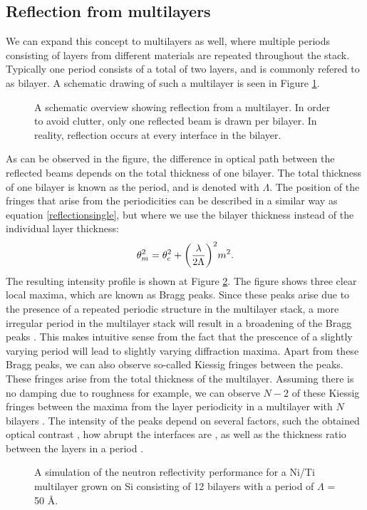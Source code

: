 \subsection{Reflection from multilayers}\label{multilayer_scattering}
We can expand this concept to multilayers as well, where multiple periods consisting of layers from different materials are repeated throughout the stack. Typically one period consists of a total of two layers, and is commonly refered to as bilayer. A schematic drawing of such a multilayer is seen in Figure \ref{multilayersketch}.
\begin{figure}[b]
	\centering
	\def\svgwidth{\textwidth}
	
	\caption{A schematic overview showing reflection from a multilayer. In order to avoid clutter, only one reflected beam is drawn per bilayer. In reality, reflection occurs at every interface in the bilayer.}
	\label{multilayersketch}
\end{figure}
As can be observed in the figure, the difference in optical path between the reflected beams depends on the total thickness of one bilayer. The total thickness of one bilayer is known as the period, and is denoted with $\Lambda$. The position of the fringes that arise from the periodicities can be described in a similar way as equation \ref{reflectionsingle}, but where we use the bilayer thickness instead of the individual layer thickness:
\begin{equation}\label{reflectionmulti}
	\theta_m^2 = \theta_c^2 + \qty(\frac{\lambda}{2\Lambda})^2m^2.
\end{equation}
The resulting intensity profile is shown at Figure \ref{simulatedmultilayer}. The figure shows three clear local maxima, which are known as Bragg peaks. Since these peaks arise due to the presence of a repeated periodic structure in the multilayer stack, a more irregular period in the multilayer stack will result in a broadening of the Bragg peaks \cite{shinjo_takada_1987}. This makes intuitive sense from the fact that the prescence of a slightly varying period will lead to slightly varying diffraction maxima. Apart from these Bragg peaks, we can also observe so-called Kiessig fringes between the peaks. These fringes arise from the total thickness of the multilayer. Assuming there is no damping due to roughness for example, we can observe $N - 2$ of these Kiessig fringes between the maxima from the layer periodicity in a multilayer with $N$ bilayers \cite{birkholz}. The intensity of the peaks depend on several factors, such the obtained optical contrast \cite{optical_contrast}, how abrupt the interfaces are \cite{interface_width_effects}, as well as the thickness ratio between the layers in a period \cite{thickness_ratio}. 
\begin{figure}
	\centering
	\def\svgwidth{\textwidth}
	
	\caption{A simulation of the neutron reflectivity performance for a Ni/Ti multilayer grown on Si consisting of 12 bilayers with a period of $\Lambda$ = 50 Å.}
	\label{simulatedmultilayer}
\end{figure}
